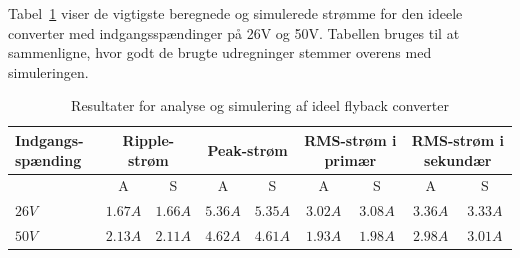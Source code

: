 Tabel~\ref{tab:result_ideal_converter} viser de vigtigste beregnede og simulerede strømme for den ideele converter med indgangsspændinger på 26V og 50V. Tabellen bruges til at sammenligne, hvor godt de brugte udregninger stemmer overens med simuleringen.

\begin{table}[H] 			
	\centering
	\begin{tabularx}{\textwidth}{|X|c|c|c|c|c|c|c|c|}
		\hline
		\textbf{Indgangs-spænding} & \multicolumn{2}{|X|}{\textbf{Ripple-strøm}} & \multicolumn{2}{|X|}{\textbf{Peak-strøm}} & \multicolumn{2}{|X|}{\textbf{RMS-strøm i primær}} & \multicolumn{2}{|X|}{\textbf{RMS-strøm i sekundær}} \\ \hline
		& A & S & A & S & A & S & A & S \\ \hline
		$26V$ & $1.67A$ & $1.66A$ & $5.36A$ & $5.35A$ & $3.02A$ & $3.08A$ & $3.36A$ & $3.33A$ \\ \hline 
		$50V$ & $2.13A$ & $2.11A$ & $4.62A$ & $4.61A$ & $1.93A$ & $1.98A$ & $2.98A$ & $3.01A$ \\ \hline
	\end{tabularx}
	\caption{Resultater for analyse og simulering af ideel flyback converter}
	\label{tab:result_ideal_converter}
\end{table}